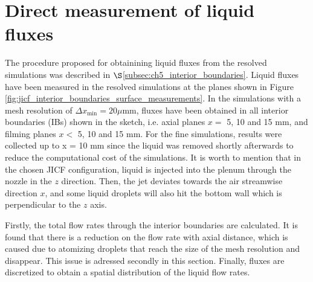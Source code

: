 
\section{Direct measurement of liquid fluxes}
\label{sec:ch5_direct_measurement_fluxes_IB}

The procedure proposed for obtainining liquid fluxes from the resolved simulations was described in $\S$\ref{subsec:ch5_interior_boundaries}. Liquid fluxes have been measured in the resolved simulations at the planes shown in Figure \ref{fig:jicf_interior_boundaries_surface_measurements}. In the simulations with a mesh resolution of $\Delta x_\mathrm{min} = 20 \mu\mathrm{mm}$, fluxes have been obtained in all interior boundaries (IBs) shown in the sketch, i.e. axial planes $x =$ 5, 10 and 15 mm, and filming planes $x <$ 5, 10 and 15 mm. For the fine simulations, results were collected up to x = 10 mm since the liquid was removed shortly afterwards to reduce the computational cost of the simulations. It is worth to mention that in the chosen JICF configuration, liquid is injected into the plenum through the nozzle in the $z$ direction. Then, the jet deviates towards the air streamwise direction $x$, and some liquid droplets will also hit the bottom wall which is perpendicular to the $z$ axis. %

Firstly, the total flow rates through the interior boundaries are calculated. It is found that there is a reduction on the flow rate with axial distance, which is caused due to atomizing droplets that reach the size of the mesh resolution and disappear. This issue is adressed secondly in this section. Finally, fluxes are discretized to obtain a spatial distribution of the liquid flow rates.

